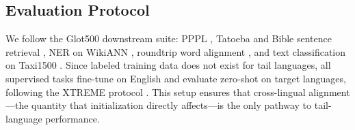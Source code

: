 \subsection{Evaluation Protocol}

We follow the Glot500 downstream suite: PPPL \citep{salazar2020pppl}, Tatoeba and Bible
sentence retrieval \citep{artetxe2019tatoeba}, NER on WikiANN \citep{pan2017wikiann},
roundtrip word alignment \citep{dufter2018roundtrip}, and text classification on
Taxi1500 \citep{ma2023taxi1500}.
Since labeled training data does not exist for tail languages, all supervised tasks
fine-tune on English and evaluate zero-shot on target languages, following the
XTREME protocol \citep{hu2020xtreme}.
This setup ensures that cross-lingual alignment---the quantity that initialization
directly affects---is the only pathway to tail-language performance.
